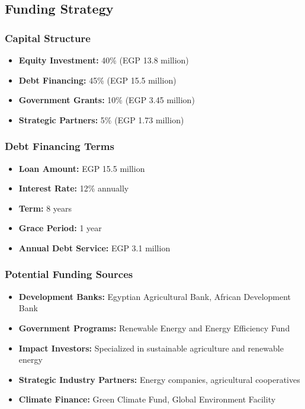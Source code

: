\subsection{Funding Strategy}

\subsubsection{Capital Structure}
\begin{itemize}
    \item \textbf{Equity Investment:} 40\% (EGP 13.8 million)
    \item \textbf{Debt Financing:} 45\% (EGP 15.5 million)
    \item \textbf{Government Grants:} 10\% (EGP 3.45 million)
    \item \textbf{Strategic Partners:} 5\% (EGP 1.73 million)
\end{itemize}

\subsubsection{Debt Financing Terms}
\begin{itemize}
    \item \textbf{Loan Amount:} EGP 15.5 million
    \item \textbf{Interest Rate:} 12\% annually
    \item \textbf{Term:} 8 years
    \item \textbf{Grace Period:} 1 year
    \item \textbf{Annual Debt Service:} EGP 3.1 million
\end{itemize}

\subsubsection{Potential Funding Sources}
\begin{itemize}
    \item \textbf{Development Banks:} Egyptian Agricultural Bank, African Development Bank
    \item \textbf{Government Programs:} Renewable Energy and Energy Efficiency Fund
    \item \textbf{Impact Investors:} Specialized in sustainable agriculture and renewable energy
    \item \textbf{Strategic Industry Partners:} Energy companies, agricultural cooperatives
    \item \textbf{Climate Finance:} Green Climate Fund, Global Environment Facility
\end{itemize}

